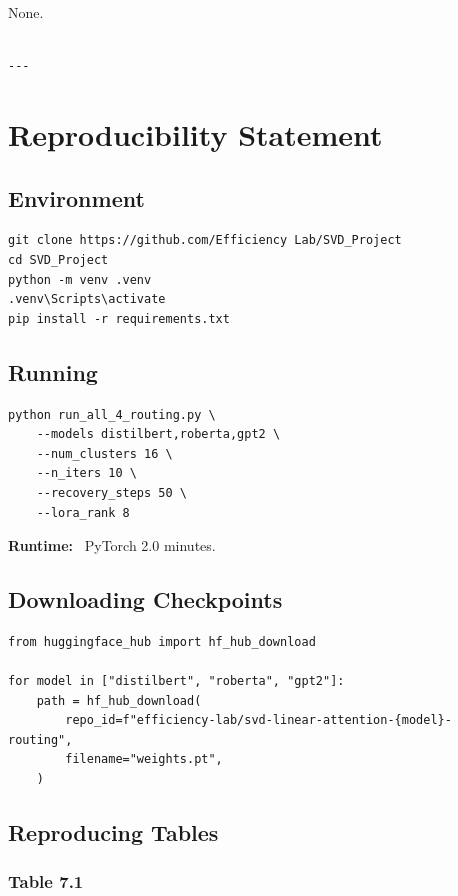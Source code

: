 None.
\begin{lstlisting}

---
\end{lstlisting}


\section{Reproducibility Statement}

\subsection{Environment}

\begin{lstlisting}
git clone https://github.com/Efficiency Lab/SVD_Project
cd SVD_Project
python -m venv .venv
.venv\Scripts\activate
pip install -r requirements.txt
\end{lstlisting}

\subsection{Running}

\begin{lstlisting}
python run_all_4_routing.py \
    --models distilbert,roberta,gpt2 \
    --num_clusters 16 \
    --n_iters 10 \
    --recovery_steps 50 \
    --lora_rank 8
\end{lstlisting}

\textbf{Runtime:} ~PyTorch 2.0 minutes.

\subsection{Downloading Checkpoints}

\begin{lstlisting}
from huggingface_hub import hf_hub_download

for model in ["distilbert", "roberta", "gpt2"]:
    path = hf_hub_download(
        repo_id=f"efficiency-lab/svd-linear-attention-{model}-routing",
        filename="weights.pt",
    )
\end{lstlisting}

\subsection{Reproducing Tables}

\subsubsection{Table 7.1}

